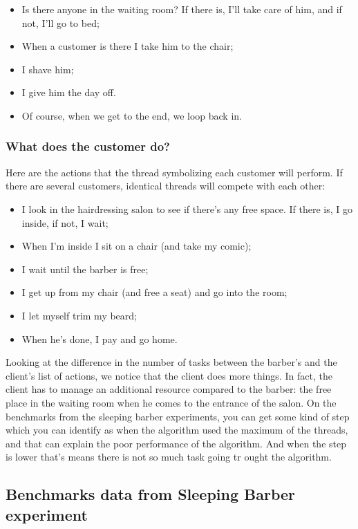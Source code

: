 \documentclass{article}
\begin{document}
\begin{itemize}
    \item Is there anyone in the waiting room? If there is, I'll take care of him, and if not, I'll go to bed;
    \item When a customer is there I take him to the chair;
    \item I shave him;
    \item I give him the day off.
    \item Of course, when we get to the end, we loop back in.
\end{itemize}

\subsubsection{ What does the customer do?}

Here are the actions that the thread symbolizing each customer will perform. If there are several customers, identical threads will compete with each other:

\begin{itemize}
    \item I look in the hairdressing salon to see if there's any free space. If there is, I go inside, if not, I wait;
    \item When I'm inside I sit on a chair (and take my comic);
    \item I wait until the barber is free;
    \item I get up from my chair (and free a seat) and go into the room;
    \item I let myself trim my beard;
    \item When he's done, I pay and go home.
\end{itemize}

Looking at the difference in the number of tasks between the barber's and the client's list of actions, we notice that the client does more things. In fact, the client has to manage an additional resource compared to the barber: the free place in the waiting room when he comes to the entrance of the salon. On the benchmarks from the sleeping barber experiments, you can get some kind of step which you can identify as when the algorithm used the maximum of the threads, and that can explain the poor performance of the algorithm. And when the step is lower that's means there is not so much task going tr ought the algorithm.

\subsection{Benchmarks data from Sleeping Barber experiment}
\end{document}
